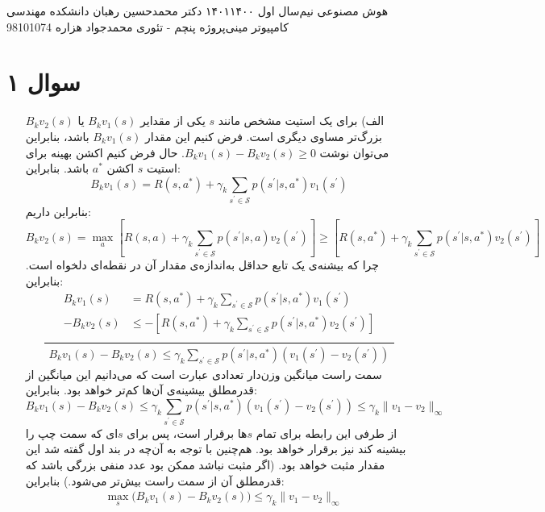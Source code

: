 \documentclass[a4paper, 12pt]{article}
\begin{document}
	\handout
	{هوش مصنوعی}
	{نیم‌سال اول
		۱۴۰۱\lr{-}۱۴۰۰}
	{دکتر محمدحسین رهبان}
	{دانشکده مهندسی کامپیوتر}
	{مینی‌پروژه پنچم - تئوری}
	{محمدجواد هزاره}
{98101074}
\noindent
\\[-6em]
\section*{سوال ۱}
\begin{enumerate}[A)]
	\item[الف)]
	برای یک استیت مشخص مانند $s$ یکی از مقدایر
	$B_kv_1(s)$
	یا
	$B_kv_2(s)$
	بزرگ‌تر مساوی دیگری است. فرض کنیم این مقدار
	$B_kv_1(s)$
	باشد، بنابراین می‌توان نوشت
	$B_kv_1(s) - B_kv_2(s) \ge 0$.
	حال فرض کنیم اکشن بهینه برای استیت $s$ اکشن $a^\ast$ باشد. بنابراین:
	\[
	B_kv_1(s) = R(s,a^\ast) + \gamma_k \sum_{s^\prime\in\mathcal{S}} p(s^\prime|s, a^\ast) v_1(s^\prime)
	\]
	بنابراین داریم:
	\[
	B_kv_2(s) = \max_a \left[R(s,a) + \gamma_k\sum_{s^\prime\in\mathcal{S}}p(s^\prime|s, a) v_2(s^\prime)\right] \ge \left[R(s,a^\ast) + \gamma_k\sum_{s^\prime\in\mathcal{S}}p(s^\prime|s,a^\ast) v_2(s^\prime)\right]
	\]
	چرا که بیشنه‌ی یک تابع حداقل به‌اندازه‌ی مقدار آن در نقطه‌ای دلخواه است. بنابراین:
	\[
	\dfrac{
		\begin{aligned}
			B_kv_1(s) &= R(s,a^\ast) + \gamma_k \sum_{s^\prime\in\mathcal{S}} p(s^\prime|s, a^\ast) v_1(s^\prime) \\[0.3em]
			-B_kv_2(s) &\le -\left[R(s,a^\ast) + \gamma_k\sum_{s^\prime\in\mathcal{S}}p(s^\prime|s,a^\ast) v_2(s^\prime)\right] \\[0.3em]
		\end{aligned}
	}{\begin{gathered}
		B_kv_1(s) - B_kv_2(s) \le \gamma_k\sum_{s^\prime\in\mathcal{S}}p(s^\prime|s,a^\ast) \left(v_1(s^\prime)-v_2(s^\prime)\right)
	\end{gathered}
	}
	\]
	سمت راست میانگین وزن‌دار تعدادی عبارت است که می‌دانیم این میانگین از قدرمطلق بیشینه‌ی آن‌ها کم‌تر خواهد بود. بنابراین:
	\[
	B_kv_1(s) - B_kv_2(s) \le \gamma_k\sum_{s^\prime\in\mathcal{S}}p(s^\prime|s,a^\ast) \left(v_1(s^\prime)-v_2(s^\prime)\right) \le \gamma_k \|v_1-v_2\|_\infty
	\]
	از طرفی این رابطه برای تمام $s$ها برقرار است، پس برای $s$ای که سمت چپ را بیشینه کند نیز برقرار خواهد بود. هم‌چنین با توجه به آن‌چه در بند اول گفته شد این مقدار مثبت خواهد بود. (اگر مثبت نباشد ممکن بود عدد منفی بزرگی باشد که قدرمطلق آن از سمت راست بیش‌تر می‌شود.) بنابراین:
	\[
	\left.\begin{aligned}
		&\max_s \big(B_kv_1(s) - B_kv_2(s)\big) \le \gamma_k\|v_1-v_2\|_\infty \\

\end{aligned}\]
\end{enumerate}
\end{document}
